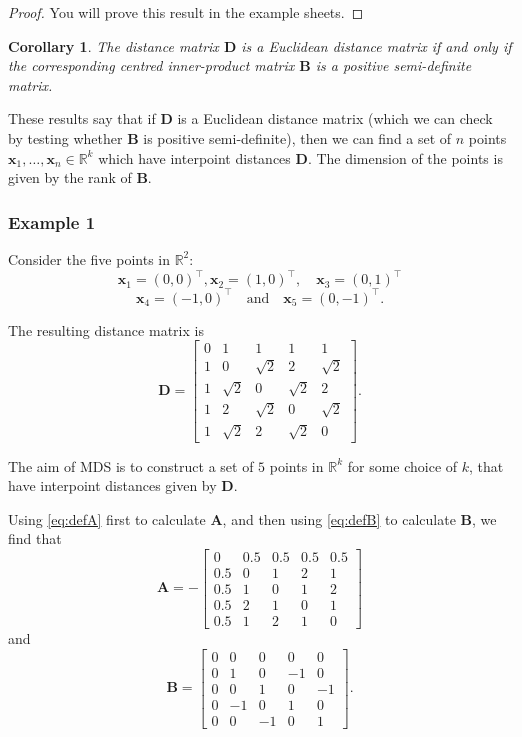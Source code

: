 \documentclass[
]{book}
\newtheorem{corollary}{Corollary}[chapter]
\theoremstyle{definition}
\theoremstyle{definition}
\theoremstyle{definition}
\theoremstyle{definition}
\theoremstyle{remark}
\begin{document}
\begin{proof}
You will prove this result in the example sheets.
\end{proof}

\begin{corollary}
\protect\hypertarget{cor:unnamed-chunk-4}{}\label{cor:unnamed-chunk-4}The distance matrix \(\mathbf D\) is a Euclidean distance matrix if and only if the corresponding centred inner-product matrix \(\mathbf B\) is a positive semi-definite matrix.
\end{corollary}

These results say that if \(\mathbf D\) is a Euclidean distance matrix (which we can check by testing whether \(\mathbf B\) is positive semi-definite), then we can find a set of \(n\) points \(\mathbf x_1, \ldots, \mathbf x_n\in \mathbb{R}^k\) which have interpoint distances \(\mathbf D\). The dimension of the points is given by the rank of \(\mathbf B\).

\hypertarget{example-1}{%
\subsubsection*{Example 1}\label{example-1}}

Consider the five points in \(\mathbb{R}^2\):
\[
\mathbf x_1=(0,0)^\top,  \mathbf x_2 =(1,0)^\top, \quad \mathbf x_3 =(0,1)^\top
\]
\[
\mathbf x_4 =(-1,0)^\top \quad \text{and} \quad \mathbf x_5=(0,-1)^\top.
\]

The resulting distance matrix is
\[
\mathbf D=\left [ \begin{array}{ccccc}
0&1&1&1&1\\
1&0&\sqrt{2}&2&\sqrt{2}\\
1&\sqrt{2}&0&\sqrt{2}&2\\
1&2&\sqrt{2}&0&\sqrt{2}\\
1&\sqrt{2}&2&\sqrt{2}&0
\end{array} \right ].
\]

The aim of MDS is to construct a set of \(5\) points in \(\mathbb{R}^k\) for some choice of \(k\), that have interpoint distances given by \(\mathbf D\).

Using \eqref{eq:defA} first to calculate \(\mathbf A\), and then using \eqref{eq:defB} to calculate \(\mathbf B\), we find that
\[
\mathbf A=-\left [ \begin{array}{ccccc}
0&0.5&0.5&0.5&0.5\\
0.5&0&1&2&1\\
0.5&1&0&1&2\\
0.5&2&1&0&1\\
0.5&1&2&1&0
\end{array} \right ]
\]
and
\[
\mathbf B=\left [ \begin{array}{ccccc}
 0& 0&0&0&0\\
0&1&0&-1&0\\
0&0&1&0&-1\\
0&-1&0&1&0\\
0&0&-1&0&1
\end{array} \right ].
\]
\end{document}
